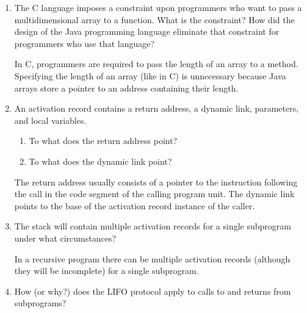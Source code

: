 \begin{enumerate}
  \item The C language imposes a constraint upon programmers
    who want to pass a multidimensional array to a function.
    What is the constraint? How did the design of the Java
    programming language eliminate that constraint for 
    programmers who use that language?

\begin{answer}

In C, programmers are required to pass the length of an array to a
method. Specifying the length of an array (like in C) is unnecessary
because Java arrays store a pointer to an address containing their
length.

\end{answer}

  \item An activation record contains a return
    address, a dynamic link, parameters, and
    local variables.
  \begin{enumerate}
    \item To what does the return address point?
    \item To what does the dynamic link point?
    \end{enumerate}
  
  \begin{answer}
  
    The return address usually consists of a pointer to the
    instruction following the call in the code segment of the calling
    program unit.  The dynamic link points to the base of the
    activation record instance of the caller.
    
\end{answer}


  \item The stack will contain multiple activation
    records for a single subprogram under what
    circumstances?
    
\begin{answer}

    In a recursive program there can be multiple activation records
    (although they will be incomplete) for a single subprogram.
    
\end{answer}


  \item How (or why?) does the LIFO protocol apply to
    calls to and returns from subprograms?
 
 \begin{answer}
 

\end{answer}
\end{enumerate}
